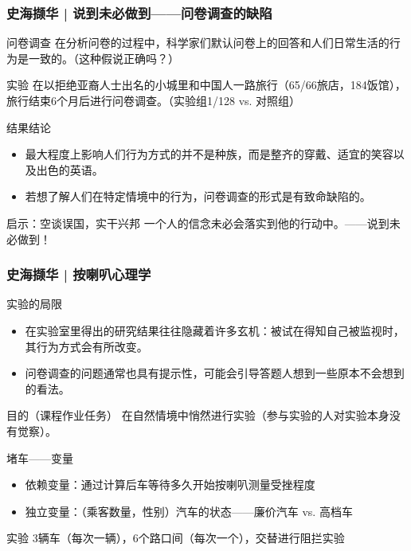 \begin{frame}
  \frametitle{史海撷华 | 说到未必做到——问卷调查的缺陷}
  \begin{block}{问卷调查}
    在分析问卷的过程中，科学家们默认问卷上的回答和人们日常生活的行为是一致的。\alert{（这种假说正确吗？）}
  \end{block}
  \vspace{-0.5em}
  \pause
  \begin{block}{实验}
    在以拒绝亚裔人士出名的小城里和中国人一路旅行（65/66旅店，184饭馆），旅行结束6个月后进行问卷调查。（实验组1/128 vs. 对照组）
  \end{block}
  \vspace{-0.5em}
  \pause
  \begin{block}{结果结论}
    \begin{itemize}
      \item 最大程度上影响人们行为方式的并不是种族，而是整齐的穿戴、适宜的笑容以及出色的英语。
      \item \alert{若想了解人们在特定情境中的行为，问卷调查的形式是有致命缺陷的。}
    \end{itemize}
  \end{block}
  \vspace{-0.5em}
  \pause
  \begin{block}{启示：\alert{空谈误国，实干兴邦}}
    一个人的信念未必会落实到他的行动中。——说到未必做到！
  \end{block}
\end{frame}

\begin{frame}
  \frametitle{史海撷华 | 按喇叭心理学}
  \begin{block}{实验的局限}
    \begin{itemize}
      \item \alert{在实验室里得出的研究结果往往隐藏着许多玄机}：被试在得知自己被监视时，其行为方式会有所改变。
      \item \alert{问卷调查的问题通常也具有提示性}，可能会引导答题人想到一些原本不会想到的看法。
    \end{itemize}
  \end{block}
  \vspace{-0.5em}
  \pause
  \begin{block}{目的（课程作业任务）}
  在自然情境中悄然进行实验（参与实验的人对实验本身没有觉察）。
  \end{block}
  \vspace{-0.5em}
  \pause
  \begin{block}{堵车——变量}
    \begin{itemize}
      \item 依赖变量：通过计算后车等待多久开始按喇叭测量受挫程度
      \item 独立变量：（乘客数量，性别）汽车的状态——廉价汽车 vs. 高档车
    \end{itemize}
  \end{block}
  \vspace{-0.5em}
  \pause
  \begin{block}{实验}
 3辆车（每次一辆），6个路口间（每次一个），交替进行阻拦实验 
  \end{block}
\end{frame}

